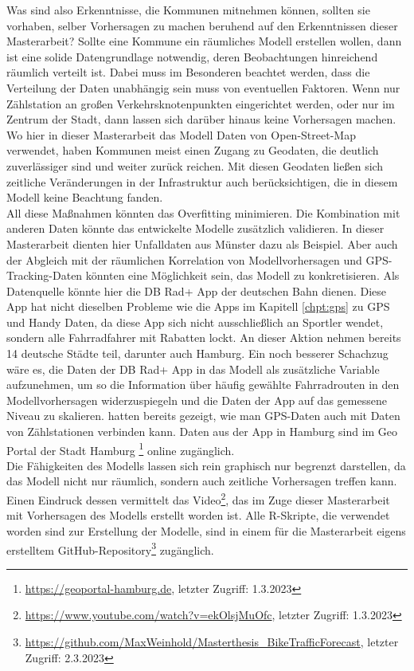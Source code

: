 \documentclass[a4paper,12pt]{thesis}
\begin{document}
Was sind also Erkenntnisse, die Kommunen mitnehmen können, sollten sie vorhaben, selber Vorhersagen zu machen beruhend auf den Erkenntnissen dieser Masterarbeit? Sollte eine Kommune ein räumliches Modell erstellen wollen, dann ist eine solide Datengrundlage notwendig, deren Beobachtungen hinreichend räumlich verteilt ist. Dabei muss im Besonderen beachtet werden, dass die Verteilung der Daten unabhängig sein muss von eventuellen Faktoren. Wenn nur Zählstation an großen Verkehrsknotenpunkten eingerichtet werden, oder nur im Zentrum der Stadt, dann lassen sich darüber hinaus keine Vorhersagen machen. Wo hier in dieser Masterarbeit das Modell Daten von Open-Street-Map verwendet, haben Kommunen meist einen Zugang zu Geodaten, die deutlich zuverlässiger sind und weiter zurück reichen. Mit diesen Geodaten ließen sich zeitliche Veränderungen in der Infrastruktur auch berücksichtigen, die in diesem Modell keine Beachtung fanden.\\
All diese Maßnahmen könnten das Overfitting minimieren. Die Kombination mit anderen Daten könnte das entwickelte Modelle zusätzlich validieren. In dieser Masterarbeit dienten hier Unfalldaten aus Münster dazu als Beispiel. Aber auch der Abgleich mit der räumlichen Korrelation von Modellvorhersagen und GPS-Tracking-Daten könnten eine Möglichkeit sein, das Modell zu konkretisieren. Als Datenquelle könnte hier die DB Rad+ App der deutschen Bahn dienen. Diese App hat nicht dieselben Probleme wie die Apps im Kapitell \ref{chpt:gps} zu GPS und Handy Daten, da diese App sich nicht ausschließlich an Sportler wendet, sondern alle Fahrradfahrer mit Rabatten lockt. An dieser Aktion nehmen bereits 14 deutsche Städte teil, darunter auch Hamburg. Ein noch besserer Schachzug wäre es, die Daten der DB Rad+ App in das Modell als zusätzliche Variable aufzunehmen, um so die Information über häufig gewählte Fahrradrouten in den Modellvorhersagen widerzuspiegeln und die Daten der App auf das gemessene Niveau zu skalieren. \cite{Alattar2021} hatten bereits gezeigt, wie man GPS-Daten auch mit Daten von Zählstationen verbinden kann. Daten aus der App in Hamburg sind im Geo Portal der Stadt Hamburg \footnote{\url{https://geoportal-hamburg.de}, letzter Zugriff: 1.3.2023} online zugänglich.\\

Die Fähigkeiten des Modells lassen sich rein graphisch nur begrenzt darstellen, da das Modell nicht nur räumlich, sondern auch zeitliche Vorhersagen treffen kann. Einen Eindruck dessen vermittelt das Video\footnote{\url{https://www.youtube.com/watch?v=ekOlsjMuOfc}, letzter Zugriff: 1.3.2023}, das im Zuge dieser Masterarbeit mit Vorhersagen des Modells erstellt worden ist. Alle R-Skripte, die verwendet worden sind zur Erstellung der Modelle, sind in einem für die Masterarbeit eigens erstelltem GitHub-Repository\footnote{\url{https://github.com/MaxWeinhold/Masterthesis_BikeTrafficForecast}, letzter Zugriff: 2.3.2023} zugänglich.
\end{document}
